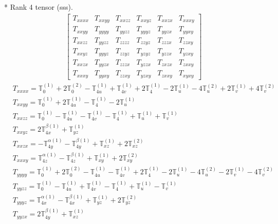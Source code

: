 \documentclass[fleqn,8pt,landscape]{jsarticle}
\begin{document}
* Rank 4 tensor (sss).
\begin{align*}
\begin{bmatrix} T_{xxxx} & T_{xxyy} & T_{xxzz} & T_{xxyz} & T_{xxzx} & T_{xxxy} \\ T_{xxyy} & T_{yyyy} & T_{yyzz} & T_{yyyz} & T_{yyzx} & T_{yyxy} \\ T_{xxzz} & T_{yyzz} & T_{zzzz} & T_{zzyz} & T_{zzzx} & T_{zzxy} \\ T_{xxyz} & T_{yyyz} & T_{zzyz} & T_{yzyz} & T_{yzzx} & T_{yzxy} \\ T_{xxzx} & T_{yyzx} & T_{zzzx} & T_{yzzx} & T_{zxzx} & T_{zxxy} \\ T_{xxxy} & T_{yyxy} & T_{zzxy} & T_{yzxy} & T_{zxxy} & T_{xyxy} \end{bmatrix}
\end{align*}
\begin{align*}
& T_{xxxx} = \mathbb{T}_{0}^{(1)} + 2 \mathbb{T}_{0}^{(2)} - \mathbb{T}_{4u}^{(1)} + \mathbb{T}_{4v}^{(1)} + 2 \mathbb{T}_{4}^{(1)} - 2 \mathbb{T}_{u}^{(1)} - 4 \mathbb{T}_{u}^{(2)} + 2 \mathbb{T}_{v}^{(1)} + 4 \mathbb{T}_{v}^{(2)} \\
& T_{xxyy} = \mathbb{T}_{0}^{(1)} + 2 \mathbb{T}_{4u}^{(1)} - \mathbb{T}_{4}^{(1)} - 2 \mathbb{T}_{u}^{(1)} \\
& T_{xxzz} = \mathbb{T}_{0}^{(1)} - \mathbb{T}_{4u}^{(1)} - \mathbb{T}_{4v}^{(1)} - \mathbb{T}_{4}^{(1)} + \mathbb{T}_{u}^{(1)} + \mathbb{T}_{v}^{(1)} \\
& T_{xxyz} = 2 \mathbb{T}_{4x}^{\beta(1)} + \mathbb{T}_{yz}^{(1)} \\
& T_{xxzx} = - \mathbb{T}_{4y}^{\alpha(1)} - \mathbb{T}_{4y}^{\beta(1)} + \mathbb{T}_{xz}^{(1)} + 2 \mathbb{T}_{xz}^{(2)} \\
& T_{xxxy} = \mathbb{T}_{4z}^{\alpha(1)} - \mathbb{T}_{4z}^{\beta(1)} + \mathbb{T}_{xy}^{(1)} + 2 \mathbb{T}_{xy}^{(2)} \\
& T_{yyyy} = \mathbb{T}_{0}^{(1)} + 2 \mathbb{T}_{0}^{(2)} - \mathbb{T}_{4u}^{(1)} - \mathbb{T}_{4v}^{(1)} + 2 \mathbb{T}_{4}^{(1)} - 2 \mathbb{T}_{u}^{(1)} - 4 \mathbb{T}_{u}^{(2)} - 2 \mathbb{T}_{v}^{(1)} - 4 \mathbb{T}_{v}^{(2)} \\
& T_{yyzz} = \mathbb{T}_{0}^{(1)} - \mathbb{T}_{4u}^{(1)} + \mathbb{T}_{4v}^{(1)} - \mathbb{T}_{4}^{(1)} + \mathbb{T}_{u}^{(1)} - \mathbb{T}_{v}^{(1)} \\
& T_{yyyz} = \mathbb{T}_{4x}^{\alpha(1)} - \mathbb{T}_{4x}^{\beta(1)} + \mathbb{T}_{yz}^{(1)} + 2 \mathbb{T}_{yz}^{(2)} \\
& T_{yyzx} = 2 \mathbb{T}_{4y}^{\beta(1)} + \mathbb{T}_{xz}^{(1)} \\

\end{align*}
\end{document}
